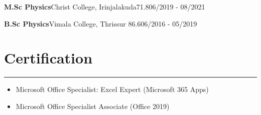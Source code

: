 \documentclass[a4paper,10pt]{article}
\begin{document}
\textbf{M.Sc Physics}\hspace{3pt}\textbar{}\hspace{3pt}Christ College, Irinjalakuda\hspace{3pt}\textbar{}\hspace{3pt}71.8\hspace{3pt}\textbar{}\hspace{3pt}06/2019 - 08/2021

\textbf{B.Sc Physics}\hspace{3pt}\textbar{}\hspace{3pt}Vimala College, Thrissur \hspace{3pt}\textbar{}\hspace{3pt}86.6\hspace{3pt}\textbar{}\hspace{3pt}06/2016 - 05/2019

\section{\textbf{Certification}}
\vspace{0.15em}
\hrule
\vspace{0.15em}
\begin{itemize}[left=0pt]
    \item Microsoft Office Specialist: Excel Expert (Microsoft 365 Apps)
    \item Microsoft Office Specialist Associate (Office 2019)
\end{itemize}
\end{document}
